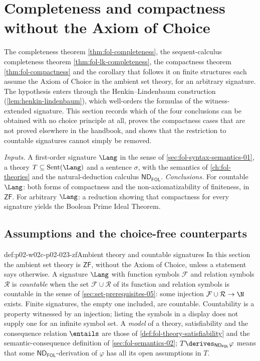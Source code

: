 \section{Completeness and compactness without the Axiom of Choice}
\label{sec:p02-w02c-p02-023-choice-free}

The completeness theorem \cref{thm:fol-completeness}, the sequent-calculus
completeness theorem \cref{thm:fol-lk-completeness}, the compactness theorem
\cref{thm:fol-compactness} and the corollary that follows it on finite
structures each assume the Axiom of Choice in the ambient set theory, for an
arbitrary signature.
The hypothesis enters through the Henkin--Lindenbaum construction
(\cref{lem:henkin-lindenbaum}), which well-orders the formulas of the
witness-extended signature.  This section records which of the four
conclusions can be obtained with no choice principle at all, proves the
compactness cases that are not proved elsewhere in the handbook, and shows
that the restriction to countable signatures cannot simply be removed.

\emph{Inputs.}  A first-order signature \(\Lang\) in the sense of
\cref{sec:fol-syntax-semantics-01}, a theory \(T\subseteq\operatorname{Sent}(\Lang)\) and
a sentence \(\sigma\), with the semantics of \cref{ch:fol-theories} and the
natural-deduction calculus \(\mathsf{ND}_{\mathsf{FOL}}\).  \emph{Conclusions.}  For
countable \(\Lang\): both forms of compactness and the non-axiomatizability
of finiteness, in \(\mathsf{ZF}\).  For arbitrary \(\Lang\): a reduction
showing that compactness for every signature yields the Boolean Prime Ideal
Theorem.

\subsection{Assumptions and the choice-free counterparts}
\label{sec:p02-w02c-p02-023-assumptions}

\begin{hbconvention}{def:p02-w02c-p02-023-zf}{Ambient theory and countable signatures}
In this section the ambient set theory is \(\mathsf{ZF}\), without the Axiom
of Choice, unless a statement says otherwise.  A signature
\(\Lang\) with function symbols \(\mathcal F\) and relation symbols \(\mathcal R\)
is \emph{countable} when the set \(\mathcal F\cup\mathcal R\) of its function
and relation symbols is countable in the sense of
\cref{sec:set-prerequisites-05}: some injection
\(\mathcal F\cup\mathcal R\to\N\) exists.  Finite signatures, the empty one
included, are countable.  Countability is a property witnessed by an
injection; listing the symbols in a display does not supply one for an
infinite symbol set.  A \emph{model} of a theory, satisfiability and the
consequence relation \(\entails\) are those of
\cref{def:fol-theory-satisfiability} and the semantic-consequence definition
of \cref{sec:fol-semantics-02}; \(T\derives_{\mathsf{ND}_{\mathsf{FOL}}}\varphi\) means that
some \(\mathsf{ND}_{\mathsf{FOL}}\)-derivation of \(\varphi\) has all its open assumptions in
\(T\).
\end{hbconvention}

